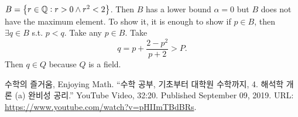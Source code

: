 \documentclass[11pt,openany]{article}
\begin{document}
\begin{exercise*}
	$B=\set{r\in\mathbb{Q}:r>0\land r^2<2}$. Then $B$ has a lower bound $\alpha=0$ but $B$ does not have the maximum element. To show it, it is enough to show if $p\in B$, then $\exists q\in B$ s.t. $p<q$.
	Take any $p\in B$. Take \[
	q=p+\frac{2-p^2}{p+2}>P.
	\] Then $q\in Q$ because $Q$ is a field.
\end{exercise*}



\begin{thebibliography}{9}
	수학의 즐거움, Enjoying Math. ``수학 공부, 기초부터 대학원 수학까지, 4. 해석학 개론 (a) 완비성 공리.'' YouTube Video, 32:20. Published 
	September 09, 2019. URL: \url{https://www.youtube.com/watch?v=pHIImTBdBRs}.
\end{thebibliography}
\end{document}
